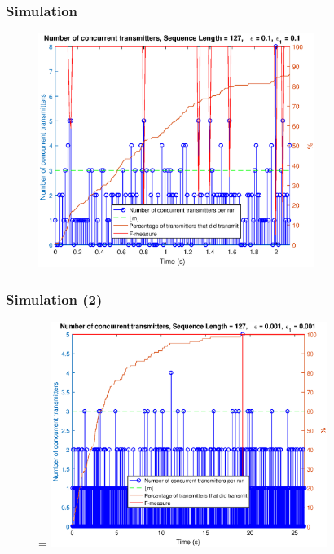\documentclass{beamer}
\begin{document}
	\begin{frame}\frametitle{Simulation}
		
		\begin{figure}[t]
			\centering
			\includegraphics[width=0.8\textwidth]{simulation-1.eps}
		\end{figure}


	\end{frame}

	\begin{frame}\frametitle{Simulation (2)}
		
		\begin{figure}[t]=
			\centering
			\includegraphics[width=0.8\textwidth]{simulation-2.eps}
		\end{figure}



	\end{frame}
\end{document}
